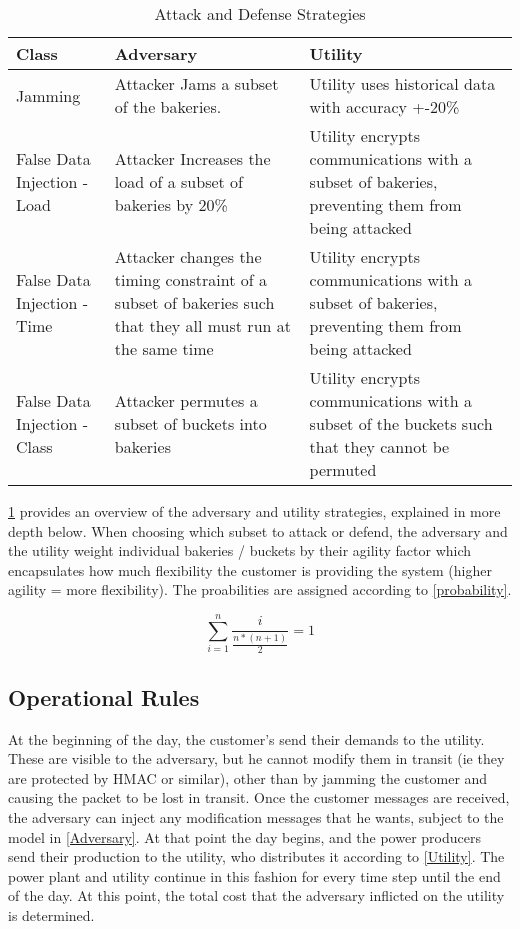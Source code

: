 \documentclass[conference]{IEEEtran}
\begin{document}
\begin{table}[!htbp]
\label{strategies}
\centering
\begin{tabular}{p{2cm} | p{3cm} | p{3cm}}
\toprule
Class & Adversary & Utility\\
\midrule
Jamming & Attacker Jams a subset of the bakeries.  & Utility uses historical data with accuracy +-20\% \\
False Data Injection - Load &  Attacker Increases the load of a subset of bakeries by 20\% & Utility encrypts communications with a subset of bakeries, preventing them from being attacked \\
False Data Injection - Time & Attacker changes the timing constraint of a subset of bakeries such that they all must run at the same time & Utility encrypts communications with a subset of bakeries, preventing them from being attacked \\
False Data Injection - Class & Attacker permutes a subset of buckets into bakeries & Utility encrypts communications with a subset of the buckets such that they cannot be permuted\\
\bottomrule
\end{tabular}
\caption{Attack and Defense Strategies}
\end{table}

\ref{strategies} provides an overview of the adversary and utility strategies, explained in more depth below.  When choosing which subset to attack or defend, the adversary and the utility weight individual bakeries / buckets by their agility factor \cite{petersen2013taxonomy} which encapsulates how much flexibility the customer
is providing the system (higher agility = more flexibility).  The proabilities are assigned according to \ref{probability}.

\begin{equation}
\label{probability}
\sum\limits_{i=1}^n \frac{i}{\frac{n*(n+1)}{2}} = 1
\end{equation}

\subsection{Operational Rules}
\label{Rules}

At the beginning of the day, the customer's send their demands to the utility. These are visible to the adversary, but he cannot modify them in transit (ie they are protected by HMAC or similar), other than by jamming the customer and causing the packet to be lost in transit.   Once the customer messages are received, the adversary can inject any modification messages that he wants, subject to the model in \ref{Adversary}. At that point the day begins, and the power producers send their production to the utility, who distributes it according to \ref{Utility}. The power plant and utility continue in this fashion for every time step until the end of the day. At this point, the total cost that the adversary inflicted
on the utility is determined.
\end{document}
